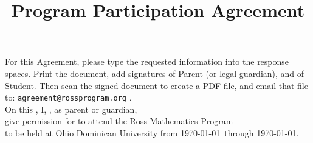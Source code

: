 \documentclass{ross}
\title{Program Participation Agreement}
\begin{document}
\maketitle
For this Agreement, please type the requested information into the response spaces.
Print the document, add signatures of Parent (or legal guardian), and of Student.  
Then scan the signed document to create a PDF file, and email that file
to: \texttt{agreement@rossprogram.org} . \\

On this , I, , 
as parent or guardian, \\[5pt]
give permission for  to attend the Ross Mathematics Program \\[5pt]
to be held at Ohio Dominican University from \startsunday\today\ through
\finishfriday\today.
\end{document}
